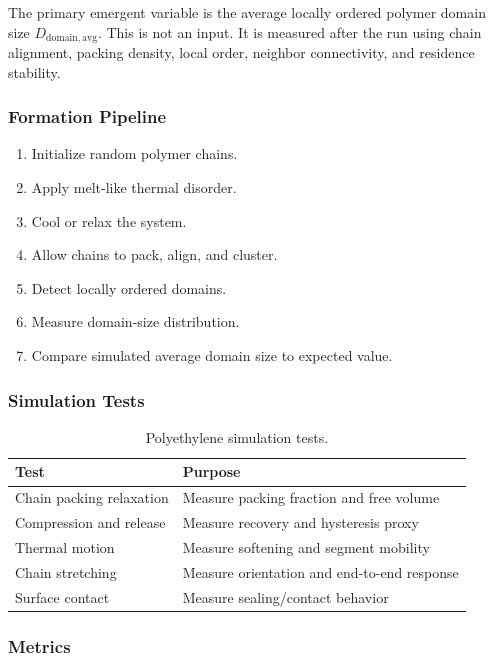 \documentclass[12pt]{article}
\begin{document}
The primary emergent variable is the average locally ordered polymer domain size
$D_{\mathrm{domain,avg}}$.
This is not an input.
It is measured after the run using chain alignment, packing density,
local order, neighbor connectivity, and residence stability.

\subsubsection*{Formation Pipeline}

\begin{enumerate}[noitemsep]
	\item Initialize random polymer chains.
	\item Apply melt-like thermal disorder.
	\item Cool or relax the system.
	\item Allow chains to pack, align, and cluster.
	\item Detect locally ordered domains.
	\item Measure domain-size distribution.
	\item Compare simulated average domain size to expected value.
\end{enumerate}

\subsubsection*{Simulation Tests}

\begin{table}[H]
\centering
\caption{Polyethylene simulation tests.}
\label{tab:pe_tests}
\begin{tabular}{ll}
\toprule
\textbf{Test} & \textbf{Purpose} \\
\midrule
Chain packing relaxation & Measure packing fraction and free volume \\
Compression and release  & Measure recovery and hysteresis proxy \\
Thermal motion           & Measure softening and segment mobility \\
Chain stretching         & Measure orientation and end-to-end response \\
Surface contact          & Measure sealing/contact behavior \\
\bottomrule
\end{tabular}
\end{table}

\subsubsection*{Metrics}
\end{document}
